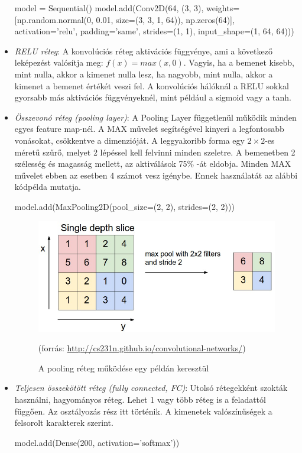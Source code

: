 \begin{itemize}
\begin{python}
model = Sequential()
model.add(Conv2D(64, (3, 3),
	weights=[np.random.normal(0, 0.01,
	size=(3, 3, 1, 64)), np.zeros(64)],
	activation='relu', padding='same',
	strides=(1, 1),
	input_shape=(1, 64, 64)))
\end{python}

\item \textit{RELU réteg}: A konvolúciós réteg aktivációs függvénye, ami a következő leképezést valósítja meg: $f(x) = max(x, 0)$. Vagyis, ha a bemenet kisebb, mint nulla, akkor a kimenet nulla lesz, ha nagyobb, mint nulla, akkor a kimenet a bemenet értékét veszi fel. A konvolúciós hálóknál a RELU sokkal gyorsabb más aktivációs függvényeknél, mint például a sigmoid vagy a tanh.
\item \textit{Összevonó réteg (pooling layer)}: A Pooling Layer függetlenül működik minden egyes feature map-nél. A MAX művelet segítségével kinyeri a legfontosabb vonásokat, csökkentve a dimenzióját. A leggyakoribb forma egy $2 \times 2$-es méretű szűrő, melyet 2 lépéssel kell felvinni minden szeletre. A bemenetben 2 szélesség és magasság mellett, az aktiválások 75\% -át eldobja. Minden MAX művelet ebben az esetben 4 számot vesz igénybe. Ennek használatát az alábbi kódpélda mutatja.
\begin{python}
model.add(MaxPooling2D(pool_size=(2, 2), strides=(2, 2)))
\end{python}

\begin{figure}[h]
\centering
\includegraphics[scale=0.3]{images/maxpool}
\caption{A pooling réteg működése egy példán keresztül}
\label{fig:maxpool}
(forrás: \url{http://cs231n.github.io/convolutional-networks/})
\end{figure}

\item \textit{Teljesen összekötött réteg (fully connected, FC)}: Utolsó rétegekként szokták használni, hagyományos réteg. Lehet 1 vagy több réteg is a feladattól függően. Az osztályozás rész itt történik. A kimenetek valószínűségek a felsorolt karakterek szerint.
\begin{python}
model.add(Dense(200, activation='softmax'))
\end{python}
\end{itemize}

